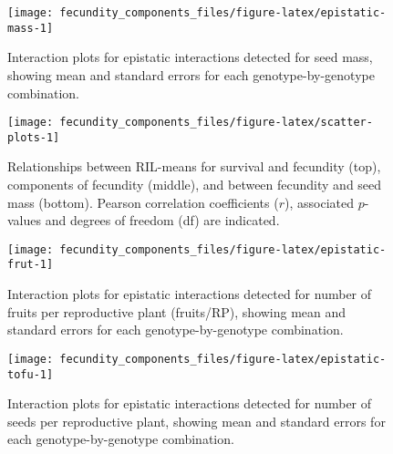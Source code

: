 \documentclass[
]{article}
\begin{document}
\newpage

\begin{figure}

{\centering \texttt{[image: fecundity\_components\_files/figure-latex/epistatic-mass-1]} 

}

\caption[Epistatic interactions for seed mass]{Interaction plots for epistatic interactions detected for seed mass, showing mean and standard errors for each genotype-by-genotype combination.}\label{fig:epistatic-mass}
\end{figure}

\newpage

\begin{figure}

{\centering \texttt{[image: fecundity\_components\_files/figure-latex/scatter-plots-1]} 

}

\caption[Scatter plots between RIL-means for survival and fecundity, components of fecundity, and between overall fecundity and seed mass]{Relationships between RIL-means for survival and fecundity (top), components of fecundity (middle), and between fecundity and seed mass (bottom). Pearson correlation coefficients ($r$), associated $p$-values and degrees of freedom (df) are indicated.}\label{fig:scatter-plots}
\end{figure}

\newpage

\begin{figure}

{\centering \texttt{[image: fecundity\_components\_files/figure-latex/epistatic-frut-1]} 

}

\caption[Epistatic interactions for number of fruits per reproductive plant]{Interaction plots for epistatic interactions detected for number of fruits per reproductive plant (fruits/RP), showing mean and standard errors for each genotype-by-genotype combination.}\label{fig:epistatic-frut}
\end{figure}

\newpage

\begin{figure}

{\centering \texttt{[image: fecundity\_components\_files/figure-latex/epistatic-tofu-1]} 

}

\caption[Epistatic interactions for seeds/RP]{Interaction plots for epistatic interactions detected for number of seeds per reproductive plant, showing mean and standard errors for each genotype-by-genotype combination.}\label{fig:epistatic-tofu}
\end{figure}
\end{document}
